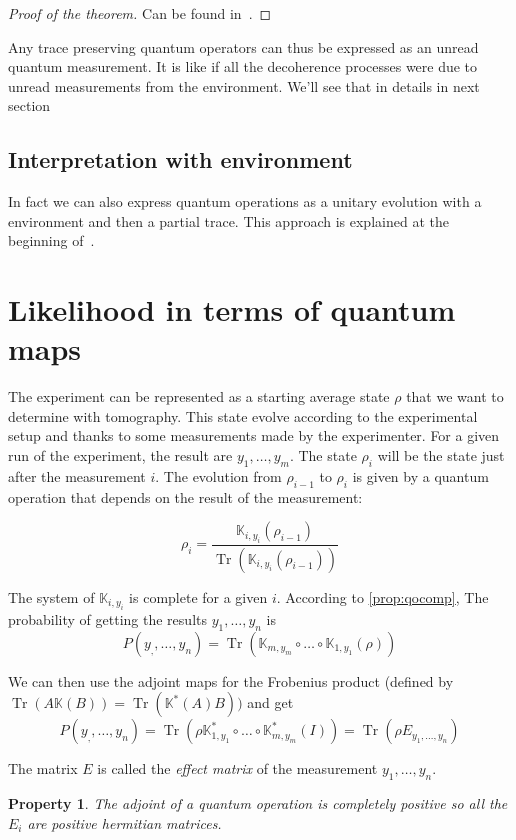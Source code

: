 \documentclass[10pt,a4paper]{report}
\theoremstyle{plain}
\newtheorem{prop}[thm]{Property}
\theoremstyle{definition}
\theoremstyle{remark}
\newcommand{\TODO}{\textbf{TODO}}
\DeclareMathOperator{\Tr}{Tr}
\newcommand{\trnorm}[1]{\frac{#1}{\Tr\left({#1}\right)}}
\begin{document}
\begin{proof}[Proof of the theorem]
  Can be found in~\cite{QCQI}.
\end{proof}

Any trace preserving quantum operators can thus be expressed as an unread
quantum measurement. It is like if all the decoherence processes were due to unread
measurements from the environment. We'll see that in details in next section

\subsection{Interpretation with environment}\label{ssec:interp}


In fact we can also express quantum operations as a unitary evolution with a environment and then a
partial trace. This approach is explained at the beginning of~\cite{QCQI}.

\section{Likelihood in terms of quantum maps}

The experiment can be represented as a starting average state $\rho$ that we
want to determine with tomography. This state evolve according to the
experimental setup and thanks to some measurements made by the experimenter. For
a given run of the experiment, the result are $y_1,\ldots,y_m$.
The state $\rho_i$ will be the state just after the measurement $i$. The
evolution from $\rho_{i-1}$ to $\rho_i$ is given by a quantum operation that
depends on the result of the measurement:

\[\rho_i = \trnorm{\mathbb K_{i,y_i}(\rho_{i-1})}\]

The system of $\mathbb K_{i,y_i}$ is complete for a given $i$. According to
\cref{prop:qocomp}, The probability of getting the results $y_1, \ldots, y_n$ is
\[P(y_,,\ldots, y_n) = \Tr(\mathbb K_{m,y_m} \circ \ldots \circ \mathbb K_{1,y_1}(\rho))\]

We can then use the adjoint maps for the Frobenius product (defined by $\Tr(A\mathbb K(B)) = \Tr(\mathbb
K^*(A)B))$ and get
\[P(y_,,\ldots, y_n) = \Tr(\rho \mathbb K_{1,y_1}^* \circ \ldots \circ \mathbb
  K_{m,y_m}^*(I)) = \Tr(\rho E_{y_1,\ldots, y_n})\]

The matrix $E$ is called the \emph{effect matrix} of the measurement
$y_1,\ldots,y_n$.

\begin{prop}
  The adjoint of a quantum operation is completely positive so all the $E_i$ are
  positive hermitian matrices.
\end{prop}
\end{document}

